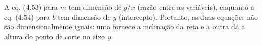 A eq. (4.53) para $m$ tem dimensão de $y/x$ (razão entre as variáveis), enquanto a eq. (4.54) para $b$ tem dimensão de $y$ (intercepto). Portanto, as duas equações não são dimensionalmente iguais: uma fornece a inclinação da reta e a outra dá a altura do ponto de corte no eixo $y$. 